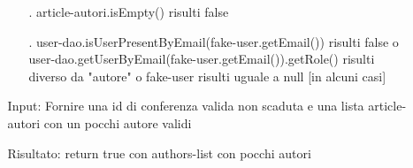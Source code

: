 \begin{itemize}
\begin{itemize}
\begin{itemize}
\item[.] article-autori.isEmpty() risulti false
\item[.] user-dao.isUserPresentByEmail(fake-user.getEmail()) risulti false o user-dao.getUserByEmail(fake-user.getEmail()).getRole() risulti diverso da "autore" o  fake-user risulti uguale a null [in alcuni casi]
\end{itemize}
\item[Input:] Fornire una id di conferenza valida non scaduta e una lista article-autori con un pocchi autore validi
\item[Risultato:] return true con authors-list con pocchi autori
\end{itemize}
\end{itemize}



